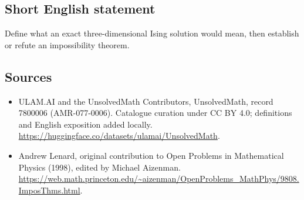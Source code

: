 \documentclass[11pt]{article}
\begin{document}
\subsection{Short English statement}
Define what an exact three-dimensional Ising solution would mean, then establish or refute an impossibility theorem.
\subsection{Sources}
\begin{itemize}
\item[\hypertarget{source:7800006:1}{S1}] ULAM.AI and the UnsolvedMath Contributors, UnsolvedMath, record 7800006 (AMR-077-0006). Catalogue curation under CC BY 4.0; definitions and English exposition added locally.
\url{https://huggingface.co/datasets/ulamai/UnsolvedMath}.
\item[\hypertarget{source:7800006:2}{S2}] Andrew Lenard, original contribution to Open Problems in Mathematical Physics (1998), edited by Michael Aizenman.
\url{https://web.math.princeton.edu/~aizenman/OpenProblems_MathPhys/9808.ImposThms.html}.
\end{itemize}
\label{end:7800006}
\end{document}
